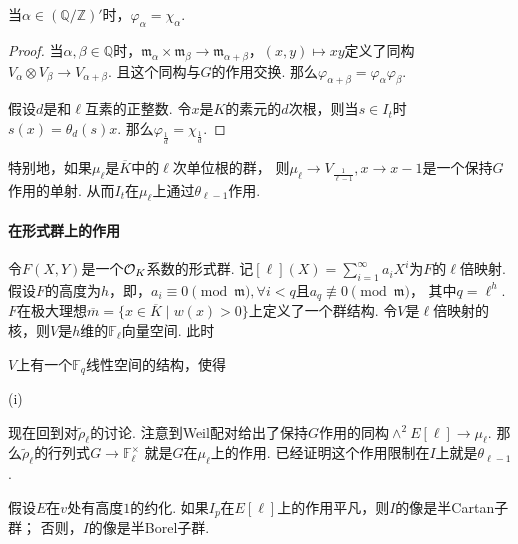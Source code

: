\begin{cprop}
    当$\alpha\in (\mathbb{Q}/\mathbb{Z})'$时，$\varphi_{\alpha} = \chi_{\alpha}$.
\end{cprop}

\begin{proof}
    当$\alpha,\beta\in\mathbb{Q}$时，$\mathfrak{m}_{\alpha} \times \mathfrak{m}_{\beta} \to \mathfrak{m}_{\alpha + \beta}$，$(x, y)\mapsto xy$定义了同构$V_{\alpha} \otimes V_{\beta}\to V_{\alpha + \beta}$.
    且这个同构与$G$的作用交换.
    那么$\varphi_{\alpha+\beta} = \varphi_{\alpha}\varphi_{\beta}$.

    假设$d$是和$\ell$互素的正整数. 令$x$是$K$的素元的$d$次根，则当$s\in I_t$时$s(x) = \theta_d(s) x$.
    那么$\varphi_{\frac{1}{d}} = \chi_{\frac{1}{d}}$.
\end{proof}

特别地，如果$\mu_{\ell}$是$\overline{K}$中的$\ell$次单位根的群，
则$\mu_{\ell}\to V_{\frac{1}{\ell - 1}}, x\to x - 1$是一个保持$G$作用的单射.
从而$I_t$在$\mu_{\ell}$上通过$\theta_{\ell - 1}$作用.

\paragraph{在形式群上的作用}
令$F(X,Y)$是一个$\mathcal{O}_K$系数的形式群.
记$[\ell](X)=\sum_{i=1}^{\infty} a_i X^i$为$F$的$\ell$倍映射.
假设$F$的高度为$h$，即，$a_i\equiv 0\pmod{\mathfrak{m}},\forall i<q$且$a_q\not\equiv 0\pmod{\mathfrak{m}}$，
其中$q=\ell^h$.
$F$在极大理想$\overline{m} = \{x\in \overline{K}\mid w(x)>0\}$上定义了一个群结构.
令$V$是$\ell$倍映射的核，则$V$是$h$维的$\mathbb{F}_{\ell}$向量空间. 此时

\begin{cprop}
    $V$上有一个$\mathbb{F}_q$线性空间的结构，使得

    (i)%
\end{cprop}

现在回到对$\tilde{\rho}_{\ell}$的讨论.
注意到Weil配对给出了保持$G$作用的同构$\wedge^2 E[\ell] \to \mu_{\ell}$.
那么$\tilde{\rho}_{\ell}$的行列式$G\to \mathbb{F}_{\ell}^{\times}$
就是$G$在$\mu_{\ell}$上的作用.
已经证明这个作用限制在$I$上就是$\theta_{\ell-1}$.

\begin{cprop}
    假设$E$在$v$处有高度$1$的约化.
    如果$I_p$在$E[\ell]$上的作用平凡，则$I$的像是半Cartan子群；
    否则，$I$的像是半Borel子群.
\end{cprop}


